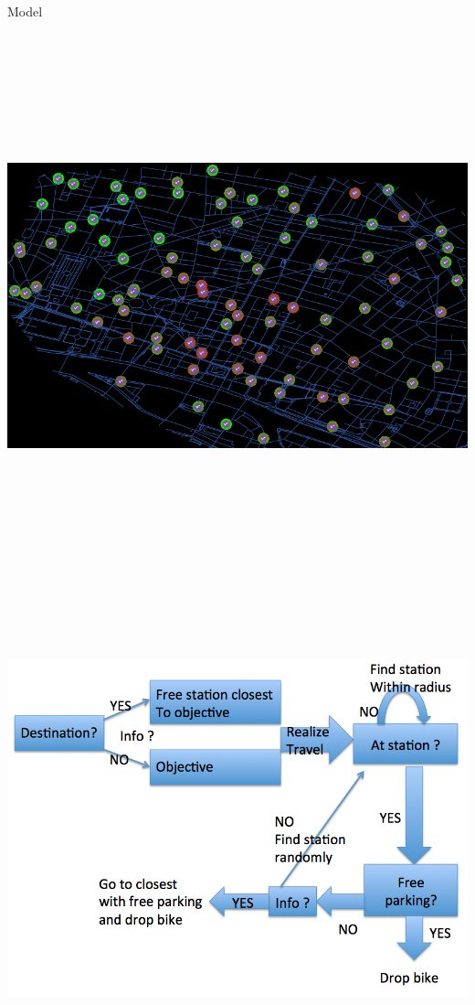 \documentclass{beamer}
\begin{document}
\begin{frame}{}
\begin{columns}[t]
\begin{column}{.49\textwidth}
\begin{block}{Model}
\begin{columns}[t]
\begin{column}{.95\textwidth}
\begin{justify}
\includegraphics[width=0.6\columnwidth,height=15cm]{figures/lfMidday}
\includegraphics[width=0.4\columnwidth,height=15cm]{figures/flowchart.png}


\end{justify}
\end{column}
\end{columns}
\end{block}
\end{column}
\end{columns}
\end{frame}
\end{document}
